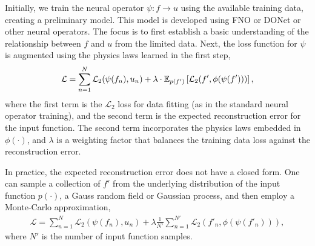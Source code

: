 
Initially, we train the neural operator \(\psi: f \rightarrow u\) using the available training data, creating a preliminary model. This model is developed using FNO or DONet or other neural operators. The focus is to first establish a basic understanding of the relationship between \(f\) and \(u\) from the limited data. Next, the loss function for \(\psi\) is augmented using the physics laws learned in the first step, %
\begin{align}
 	\mathcal{L}=  \sum_{n=1}^{N} \mathcal{L}_2(\psi(f_n),u_n) + \lambda \cdot  \EE_{p(f')} \left[\mathcal{L}_2(f', \phi(\psi(f')))\right], \notag %
 \end{align}
where the first term is the \(\mathcal{L}_2\) loss for data fitting (as in the standard neural operator training), and the second term is the expected reconstruction error for the input function.  %
The second term incorporates the physics laws embedded in $\phi(\cdot)$, and \(\lambda\) is a weighting factor that balances the training data loss against the reconstruction error.

In practice, the expected reconstruction error does not have a closed form. One can sample a collection of $f'$ from the underlying distribution of the input function $p(\cdot)$, \eg a Gauss random field or Gaussian process, and then employ a Monte-Carlo approximation, 
\begin{align}
	\mathcal{L}=  \sum_{n=1}^{N} \mathcal{L}_2(\psi(f_n),u_n) + \lambda  \frac{1}{N'} \sum_{n=1}^{N'} \mathcal{L}_2(f'_n, \phi(\psi(f'_n))), \label{eq:fine-tune-loss}
\end{align}
where \(N'\) is the number of input function samples. %



